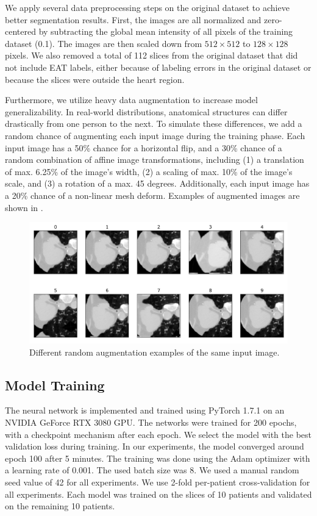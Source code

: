 We apply several data preprocessing steps on the original dataset to achieve better segmentation results. First, the images are all normalized and zero-centered by subtracting the global mean intensity of all pixels of the training dataset (0.1). The images are then scaled down from $512 \times 512$ to $128 \times 128$ pixels. We also removed a total of 112 slices from the original dataset that did not include EAT labels, either because of labeling errors in the original dataset or because the slices were outside the heart region.

Furthermore, we utilize heavy data augmentation to increase model generalizability. In real-world distributions, anatomical structures can differ drastically from one person to the next. To simulate these differences, we add a random chance of augmenting each input image during the training phase. Each input image has a 50\% chance for a horizontal flip, and a 30\% chance of a random combination of affine image transformations, including (1) a translation of max. 6.25\% of the image's width, (2) a scaling of max. 10\% of the image's scale, and (3) a rotation of a max. 45 degrees. Additionally, each input image has a 20\% chance of a non-linear mesh deform. Examples of augmented images are shown in .

\begin{figure}[b!]
\center
\includegraphics[width=\textwidth]{images/6/augmentation.png}
\caption{Different random augmentation examples of the same input image. \cite{bencevicEpicardialAdiposeTissue2021}}
\label{fig:augment}
\end{figure}

\subsection{Model Training}

The neural network is implemented and trained using PyTorch 1.7.1 on an NVIDIA GeForce RTX 3080 GPU. The networks were trained for 200 epochs, with a checkpoint mechanism after each epoch. We select the model with the best validation loss during training. In our experiments, the model converged around epoch 100 after 5 minutes. The training was done using the Adam optimizer with a learning rate of 0.001. The used batch size was 8. We used a manual random seed value of 42 for all experiments. We use 2-fold per-patient cross-validation for all experiments. Each model was trained on the slices of 10 patients and validated on the remaining 10 patients.

